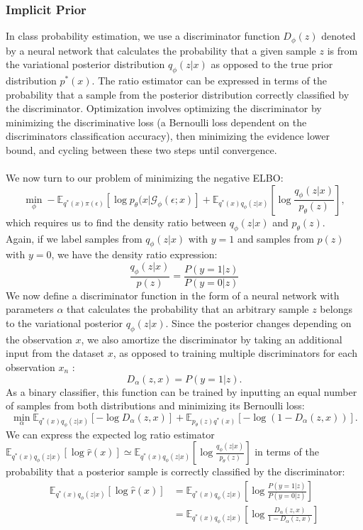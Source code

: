 \documentclass[a4paper,12pt]{article}
\numberwithin{equation}{section}
\begin{document}
\subsubsection{Implicit Prior}
In class probability estimation, we use a discriminator function $D_\phi(z)$ denoted by a neural network that calculates the probability that a given sample $z$ is from the variational posterior distribution $q_\phi(z|x)$ as opposed to the true prior distribution $p^*(x)$. The ratio estimator can be expressed in terms of the probability that a sample from the posterior distribution correctly classified by the discriminator. Optimization involves optimizing the discriminator by minimizing the discriminative loss (a Bernoulli loss dependent on the discriminators classification accuracy), then minimizing the evidence lower bound, and cycling between these two steps until convergence.\\
\\
We now turn to our problem of minimizing the negative ELBO:
\[\min_\phi -\mathbb{E}_{q^*(x)\pi(\epsilon)}[\log p_\theta (x|\mathcal{G}_\phi(\epsilon;x)]+\mathbb{E}_{q^*(x)q_\phi(z|x)}\left[\log \frac{q_\phi(z|x)}{p_\theta(z)}\right],\]
which requires us to find the density ratio between $q_\phi(z|x)$ and $p_\theta(z)$.\\
Again, if we label samples from $q_\phi(z|x)$ with $y=1$ and samples from $p(z)$ with $y=0$, we have the density ratio expression:
\[\frac{q_\phi(z|x)}{p(z)}=\frac{P(y=1|z)}{P(y=0|z)}\]
We now define a discriminator function in the form of a neural network with parameters $\alpha$ that calculates the probability that an arbitrary sample $z$ belongs to the variational posterior $q_\phi(z|x)$. Since the posterior changes depending on the observation $x$, we also amortize the discriminator by taking an additional input from the dataset $x$, as opposed to training multiple discriminators for each observation $x_n$ :
\[D_\alpha(z,x)=P(y=1|z).\]
As a binary classifier, this function can be trained by inputting an equal number of samples from both distributions and minimizing its Bernoulli loss:
\[\min_\alpha \mathbb{E}_{q^*(x)q_\phi(z|x)}[-\log D_\alpha(z,x)]+\mathbb{E}_{p_\theta(z)q^*(x)}[-\log (1-D_\alpha(z,x))].\]
We can express the expected log ratio estimator $\mathbb{E}_{q^*(x)q_\phi(z|x)}[\log \hat{r}(x)]\simeq \mathbb{E}_{q^*(x)q_\phi(z|x)} [\log \frac{q_\phi(z|x)}{p_\theta(z)}]$ in terms of the probability that a posterior sample is correctly classified by the discriminator:
\begin{align*}
\mathbb{E}_{q^*(x)q_\phi(z|x)}[\log \hat{r}(x)]&=\mathbb{E}_{q^*(x)q_\phi(z|x)}\left[\log \frac{P(y=1|z)}{P(y=0|z)}\right]\\
&= \mathbb{E}_{q^*(x)q_\phi(z|x)}\left[\log \frac{D_\alpha(z,x)}{1-D_\alpha(z,x)}\right]
\end{align*}
\end{document}
